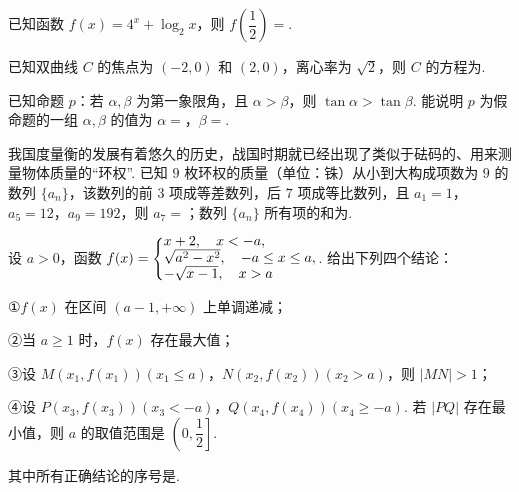 \documentclass[a4paper,11pt]{report}
\begin{document}
\begin{examquestions}[start=11]
\item 已知函数 $f(x)=4^x+\log_2 x$，则 $f\left(\dfrac12\right)=$\blank.
\item 已知双曲线 $C$ 的焦点为 $(-2,0)$ 和 $(2,0)$，离心率为 $\sqrt2$，则 $C$ 的方程为\blank.
\item 已知命题 $p$：若 $\alpha,\beta$ 为第一象限角，且 $\alpha>\beta$，则 $\tan\alpha>\tan\beta$. 能说明 $p$ 为假命题的一组 $\alpha,\beta$ 的值为 $\alpha=$\blank，$\beta=$\blank.
\item 我国度量衡的发展有着悠久的历史，战国时期就已经出现了类似于砝码的、用来测量物体质量的“环权”. 已知 $9$ 枚环权的质量（单位：铢）从小到大构成项数为 $9$ 的数列 $\{a_n\}$，该数列的前 $3$ 项成等差数列，后 $7$ 项成等比数列，且 $a_1=1$，$a_5=12$，$a_9=192$，则 $a_7=$\blank；数列 $\{a_n\}$ 所有项的和为\blank.
\newpage
\item 设 $a>0$，函数 $f(x)=\linsys{x+2,\quad x<-a,\\\sqrt{a^2-x^2},\quad -a\leq x\leq a,\\-\sqrt{x-1},\quad x>a}$. 给出下列四个结论：

①$f(x)$ 在区间 $(a-1,+\infty)$ 上单调递减；

②当 $a\geq1$ 时，$f(x)$ 存在最大值；

③设 $M(x_1,f(x_1))(x_1\leq a)$，$N(x_2,f(x_2))(x_2>a)$，则 $|MN|>1$；

④设 $P(x_3,f(x_3))(x_3<-a)$，$Q(x_4,f(x_4))(x_4\geq -a)$. 若 $|PQ|$ 存在最小值，则 $a$ 的取值范围是 $\left(0,\dfrac12\right]$. 

其中所有正确结论的序号是\blank.
\end{examquestions}
\end{document}
